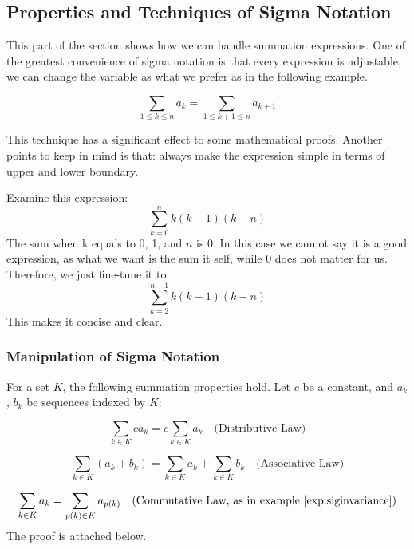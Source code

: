 \subsection{Properties and Techniques of Sigma Notation}
This part of the section shows how we can handle summation expressions.
One of the greatest convenience of sigma notation is that every expression is adjustable, we can change the variable as what we prefer as in the following example.
\begin{example} \label{exp:siginvariance}
 \[
\sum_{1 \leq k \leq n} a_k = \sum_{1 \leq k+1 \leq n} a_{k+1}
\]
\end{example}
This technique has a significant effect to some mathematical proofs.
Another points to keep in mind is that: always make the expression simple in terms of upper and lower boundary.
\begin{example}
    Examine this expression: 
    \[\sum_{k=0}^{n} k(k-1)(k-n)\]
    The sum when k equals to 0, 1, and $n$ is 0. In this case we cannot say it is a good expression, as what we want is the sum it self, while 0 does not matter for us. Therefore, we just fine-tune it to:
    \[\sum_{k=2}^{n-1} k(k-1)(k-n)\]
    This makes it concise and clear.
\end{example}

\subsubsection{Manipulation of Sigma Notation}
For a set \( K \), the following summation properties hold. Let \( c \) be a constant, and \( a_k \), \( b_k \) be sequences indexed by \( K \):

\begin{equation}
    \sum_{k \in K} c a_k = c \sum_{k \in K} a_k \quad \text{(Distributive Law)}
    \label{eq:constant_factor}
\end{equation}

\begin{equation}
    \sum_{k \in K} (a_k + b_k) = \sum_{k \in K} a_k + \sum_{k \in K} b_k \quad \text{(Associative Law)}
    \label{eq:summation_of_sums}
\end{equation}

\begin{equation}
    \sum_{k \in K} a_k = \sum_{p(k) \in K} a_{p(k)} \quad \text{(Commutative Law, as in example \autoref{exp:siginvariance})} 
    \label{eq:permutation_invariance}
\end{equation}
The proof is attached below.

